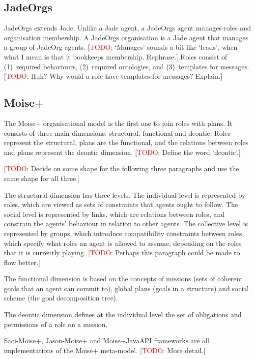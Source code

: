 \documentclass{article}
\newcommand{\todo}[1]{[\textcolor{red}{TODO}: #1]}
\begin{document}
\subsection{JadeOrgs}

JadeOrgs extends Jade. Unlike a Jade agent, a JadeOrgs
agent manages roles and organisation membership. A JadeOrgs
organisation is a Jade agent that manages a group of JadeOrg
agents. \todo{`Manages' sounds a bit like `leads', when what I
mean is that it bookkeeps membership. Rephrase.} Roles consist
of (1)~required behaviours, (2)~required ontologies, and
(3)~templates for messages. \todo{Huh? Why would a role have
templates for messages? Explain.}

\subsection{Moise+} 

The Moise+ organisational model is the first one to join roles
with plans. It consists of three main dimensions: structural,
functional and deontic. Roles represent the structural, plans
are the functional, and the relations between roles and
plans represent the deontic dimension. \todo{Define the word
`deontic'.}

\todo{Decide on some shape for the following three paragraphs
and use the same shape for all three.}

The structural dimension has three levels. The individual level
is represented by roles, which are viewed as sets of constraints
that agents ought to follow. The social level is represented
by links, which are relations between roles, and constrain the
agents' behaviour in relation to other agents. The collective
level is represented by groups, which introduce compatibility
constraints between roles, which specify what roles an agent is
allowed to assume, depending on the roles that it is currently
playing. \todo{Perhaps this paragraph could be made to flow
better.}

The functional dimension is based on the concepts of missions
(sets of coherent goals that an agent can commit to), global
plans (goals in a structure) and social scheme (the goal
decomposition tree). 

The deontic dimension defines at the individual level the set of
obligations and permissions of a role on a mission.

Saci-Moise+, Jason-Moise+ and Moise+JavaAPI frameworks are all
implementations of the Moise+ meta-model. \todo{More detail.}
\end{document}
